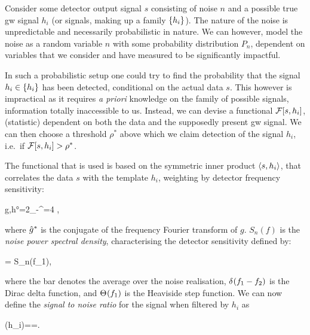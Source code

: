 \documentclass[
  10pt,
  a4paper,
  DIV=11,
  numbers=noendperiod,
  twoside]{scrreprt}
\let\[\relax \let\]\relax %
\DeclareRobustCommand{\[}{\begin{equation}}
\DeclareRobustCommand{\]}{\end{equation}}
\begin{document}
Consider some detector output signal \(s\) consisting of noise \(n\) and
a possible true \gls{gw} signal \(h_i\) (or signals, making up a family
\(\brk{h_i}\)). The nature of the noise is unpredictable and necessarily
probabilistic in nature. We can however, model the noise as a random
variable \(n\) with some probability distribution \(P_n\), dependent on
variables that we consider and have measured to be significantly
impactful.

In such a probabilistic setup one could try to find the probability that
the signal \(h_i\in \brk{h_i}\) has been detected, conditional on the
actual data \(s\). This however is impractical as it requires \emph{a
priori} knowledge on the family of possible signals, information totally
inaccessible to us. Instead, we can devise a functional
\(\mathcal{F}\brc{s,h_i}\), (statistic) dependent on both the data and
the supposedly present \gls{gw} signal. We can then choose a threshold
\(\rho^*\) above which we claim detection of the signal \(h_i\), i.e.~if
\(\mathcal{F}\brc{s,h_i}>\rho^*\).

The functional that is used is based on the symmetric inner product
\(\ang{s,h_i}\), that correlates the data \(s\) with the template
\(h_i\), weighting by detector frequency sensitivity:

\[\ang{g,h}=2\int\limits_{-\infty}^{\infty}=4 ,\]

where \(\conj{\ft{g}{2\pi}}\) is the conjugate of the frequency Fourier
transform of \(g\). \(S_n(f)\) is the \emph{noise power spectral
density}, characterising the detector sensitivity defined by:

\[
=\half {} S_n(f_1),
\]

where the bar denotes the average over the noise realisation,
\(\deltafn{f_1-f_2}\) is the Dirac delta function, and \(\thetafn{f_1}\)
is the Heaviside step function. We can now define the \emph{signal to
noise ratio} for the signal when filtered by \(h_i\) as 

\[
\rho (h_i)==.
\]
\end{document}
